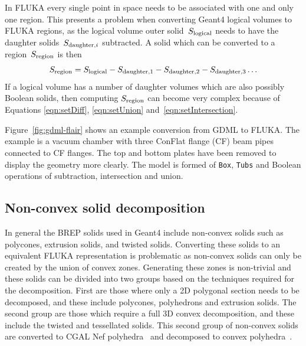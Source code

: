 \documentclass[preprint,12pt]{elsarticle}
\begin{document}
In FLUKA every single point in space needs to be associated with one and only one region. This presents a problem
when converting Geant4 logical volumes to FLUKA regions, as the logical volume outer solid~$S_{\rm logical}$
needs to have the daughter  solids~$S_{{\rm daughter},i}$ subtracted. A solid which can be converted
to a region~$S_{\rm region}$ is then
\begin{equation}
S_{\rm region} =  S_{\rm logical} - S_{\rm daughter,1} - S_{\rm daughter,2} - S_{\rm daughter,3} \ldots
\label{eqn:logicalSubtraction}
\end{equation}
If a logical volume has a number of daughter volumes which are also possibly Boolean solids, then computing
$S_{\rm region}$ can become very complex because of Equations \ref{eqn:setDiff}, \ref{eqn:setUnion} and~\ref{eqn:setIntersection}.

Figure~\ref{fig:gdml-flair} shows an example conversion from GDML to FLUKA. The example is a
vacuum chamber with three ConFlat flange (CF) beam pipes connected to CF flanges. The top and bottom plates
have been removed to display the geometry more clearly. The model is formed of \verb|Box|,
\verb|Tubs| and Boolean operations of subtraction, intersection and union.

\subsection{Non-convex solid decomposition}
In general the BREP solids used in Geant4 include non-convex solids such
as polycones, extrusion solids, and twisted solids.  Converting these
solids to an equivalent FLUKA representation is problematic as non-convex
solids can only be created by the union of convex zones. Generating these
zones is non-trivial and these solids can be divided into two groups based
on the techniques required for the decomposition.  First are those where only a 2D polygonal
section needs to be decomposed, and these include polycones, polyhedrons
and extrusion solids.  The second group are those which require a full 3D
convex decomposition, and these include the twisted and tessellated solids.
This second group of non-convex solids are converted to CGAL Nef
polyhedra~\cite{cgal:hk-bonp3-20b} and decomposed to convex
polyhedra~\cite{cgal:h-emspe-20b}.
\end{document}
